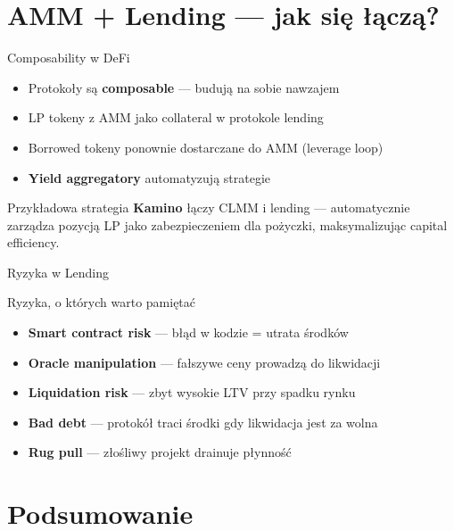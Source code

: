 \section{AMM + Lending --- jak się łączą?}

\begin{frame}{Composability w DeFi}
  \begin{itemize}
    \item Protokoły są \textbf{composable} --- budują na sobie nawzajem
    \item LP tokeny z AMM jako collateral w protokole lending
    \item Borrowed tokeny ponownie dostarczane do AMM (leverage loop)
    \item \textbf{Yield aggregatory} automatyzują strategie
  \end{itemize}
  \vspace{0.3cm}
  \begin{exampleblock}{Przykładowa strategia}
    \textbf{Kamino} łączy CLMM i lending --- automatycznie zarządza pozycją
    LP jako zabezpieczeniem dla pożyczki, maksymalizując capital efficiency.
  \end{exampleblock}
\end{frame}

\begin{frame}{Ryzyka w Lending}
  \begin{alertblock}{Ryzyka, o których warto pamiętać}
    \begin{itemize}
      \item \textbf{Smart contract risk} --- błąd w kodzie = utrata środków
      \item \textbf{Oracle manipulation} --- fałszywe ceny prowadzą do likwidacji
      \item \textbf{Liquidation risk} --- zbyt wysokie LTV przy spadku rynku
      \item \textbf{Bad debt} --- protokół traci środki gdy likwidacja jest za wolna
      \item \textbf{Rug pull} --- złośliwy projekt drainuje płynność
    \end{itemize}
  \end{alertblock}
\end{frame}

\section{Podsumowanie}

